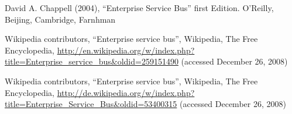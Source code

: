 %
%

%
% 
% 
%
\begin{thebibliography}{99.}
%
%
%
 David A. Chappell (2004),
``Enterprise Service Bus'' first Edition. 
O'Reilly, Beijing, Cambridge, Farnhman

Wikipedia contributors,
``Enterprise service bus'',
Wikipedia, The Free Encyclopedia,
\url{http://en.wikipedia.org/w/index.php?title=Enterprise_service_bus&oldid=259151490}
(accessed December 26, 2008)

Wikipedia contributors,
``Enterprise service bus'',
Wikipedia, The Free Encyclopedia,
\url{http://de.wikipedia.org/w/index.php?title=Enterprise_Service_Bus&oldid=53400315}
(accessed December 26, 2008)

\end{thebibliography}
